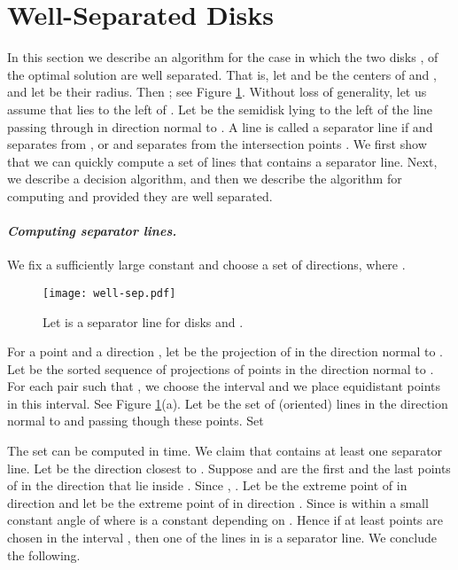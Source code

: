 \documentclass[11pt]{myclass}
\begin{document}
\section{Well-Separated Disks}
In this section we describe an algorithm for the case in which the two disks ,  of the optimal solution are well separated.  That is, let  and  be the centers of  and , and let  be their radius.  Then ; see Figure \ref{fig:well-sep}.  Without loss of generality, let us assume that  lies to the left of .
Let  be the semidisk lying to the left of the line passing through  in direction normal to .  
A line  is called a separator line if  and  separates  from , or  and  separates  from the intersection points .  
We first show that we can quickly compute a set of  lines that contains a separator line.  Next, we describe a decision algorithm, and then we describe the algorithm for computing  and  provided they are well separated.  

\paragraph{\textbf{\emph{Computing separator lines.}}}
We fix a sufficiently large constant  and choose a set  of directions, where .  

\begin{figure}
  \centering
  \texttt{[image: well-sep.pdf]}
\caption{\label{fig:well-sep} 
Let  is a separator line for disks  and .
}
\end{figure}




For a point  and a direction , let  be the projection of  in the direction normal to .  Let  be the sorted sequence of projections of points in the direction normal to .  For each pair  such that , we choose the interval  and we place  equidistant points in this interval.  See Figure \ref{fig:well-sep}(a).  Let  be the set of (oriented) lines in the direction normal to  and passing though these points.  Set 


The set  can be computed in  time.
We claim that  contains at least one separator line.  
Let  be the direction closest to .  Suppose  and  are the first and the last points of  in the direction  that lie inside .  Since , .  
Let  be the extreme point of  in direction  and let  be the extreme point of  in direction .
Since  is within a small constant angle of   
where  is a constant depending on .  Hence if at least  points are chosen in the interval , then one of the lines in  is a separator line.  We conclude the following.
\end{document}
